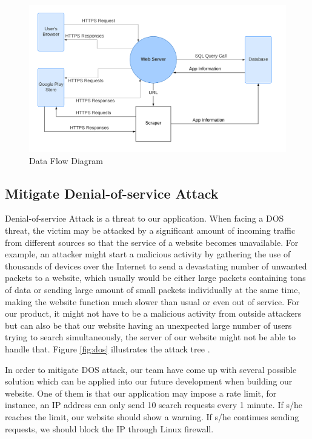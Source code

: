 \documentclass[12pt, a4paper]{article}
\begin{document}
\begin{figure}[ht]
\centering
\includegraphics[width=1\textwidth]{Data_Flow_Diagram.png}
\caption{Data Flow Diagram}
\label{fig:Data_Flow}
\end{figure}

\subsection{Mitigate Denial-of-service Attack}
Denial-of-service Attack is a threat to our application. When facing a DOS threat, the victim may be attacked by a significant amount of incoming traffic from different sources so that the service of a website becomes unavailable. For example, an attacker might start a malicious activity by gathering the use of thousands of devices over the Internet to send a devastating number of unwanted packets to a website, which usually would be either large packets containing tons of data or sending large amount of small packets individually at the same time, making the website function much slower than usual or even out of service. For our product, it might not have to be a malicious activity from outside attackers but can also be that our website having an unexpected large number of users trying to search simultaneously, the server of our website might not be able to handle that.
Figure \ref{fig:dos} illustrates the attack tree .

In order to mitigate DOS attack, our team have come up with several possible solution which can be applied into our future development when building our website. One of them is that our application may impose a rate limit, for instance, an IP address can only send 10 search requests every 1 minute. If s/he reaches the limit, our website should show a warning. If s/he continues sending requests, we should block the IP through Linux firewall.
\end{document}
